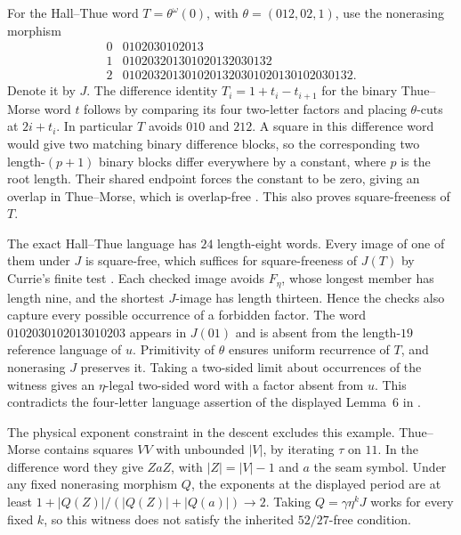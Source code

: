 For the Hall--Thue word \(T=\theta^\omega(0)\), with \(\theta=(012,02,1)\), use the nonerasing morphism
\[
\begin{array}{c|l}
0&0102030102013\\
1&010203201301020132030132\\
2&0102032013010201320301020130102030132 .
\end{array}
\]
Denote it by \(J\). The difference identity \(T_i=1+t_i-t_{i+1}\) for the binary Thue--Morse word \(t\) follows by comparing its four two-letter factors and placing \(\theta\)-cuts at \(2i+t_i\). In particular \(T\) avoids \(010\) and \(212\). A square in this difference word would give two matching binary difference blocks, so the corresponding two length-\((p+1)\) binary blocks differ everywhere by a constant, where \(p\) is the root length. Their shared endpoint forces the constant to be zero, giving an overlap in Thue--Morse, which is overlap-free \cite{KS}. This also proves square-freeness of \(T\).

The exact Hall--Thue language has \(24\) length-eight words. Every image of one of them under \(J\) is square-free, which suffices for square-freeness of \(J(T)\) by Currie's finite test \cite{CurrieTest}. Each checked image avoids \(F_\eta\), whose longest member has length nine, and the shortest \(J\)-image has length thirteen. Hence the checks also capture every possible occurrence of a forbidden factor. The word \(0102030102013010203\) appears in \(J(01)\) and is absent from the length-\(19\) reference language of \(u\). Primitivity of \(\theta\) ensures uniform recurrence of \(T\), and nonerasing \(J\) preserves it. Taking a two-sided limit about occurrences of the witness gives an \(\eta\)-legal two-sided word with a factor absent from \(u\). This contradicts the four-letter language assertion of the displayed Lemma~6 in \cite{DMO}.

The physical exponent constraint in the descent excludes this example. Thue--Morse contains squares \(VV\) with unbounded \(|V|\), by iterating \(\tau\) on \(11\). In the difference word they give \(ZaZ\), with \(|Z|=|V|-1\) and \(a\) the seam symbol. Under any fixed nonerasing morphism \(Q\), the exponents at the displayed period are at least \(1+|Q(Z)|/(|Q(Z)|+|Q(a)|)\to2\). Taking \(Q=\gamma\eta^k J\) works for every fixed \(k\), so this witness does not satisfy the inherited \(52/27\)-free condition.
